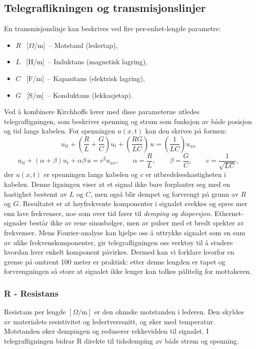 \subsection{Telegraflikningen og transmisjonslinjer}
En transmisjonslinje kan beskrives ved fire per-enhet-lengde parametre:
\begin{itemize}
    \item $R$ \, [$\Omega$/m] \,-- Motstand (ledertap),
    \item $L$ \, [H/m] \,-- Induktans (magnetisk lagring),
    \item $C$ \, [F/m] \,-- Kapasitans (elektrisk lagring),
    \item $G$ \, [S/m] \,-- Konduktans (lekkasjetap).
\end{itemize}
Ved å kombinere Kirchhoffs lover med disse parameterne utledes telegrafligningen, som beskriver spenning og strøm som funksjon av både posisjon og tid langs kabelen. For spenningen $u(x,t)$ kan den skrives på formen:
\begin{equation}
    u_{tt} + \left(\frac{R}{L} + \frac{G}{C}\right)u_t + \left(\frac{RG}{LC}\right)\,u = \left(\frac{1}{LC}\right) u_{xx}
\end{equation}
\[
    u_{tt} + \left(\alpha + \beta\right)u_t + \alpha\beta\,u = c^2 u_{xx}, \qquad \alpha=\frac{R}{L}, \qquad \beta=\frac{G}{C}, \qquad c = \frac{1}{\sqrt{LC}} ,
\]
der $u(x,t)$ er spenningen langs kabelen og $c$ er utbredelseshastigheten i kabelen.  
Denne ligningen viser at et signal ikke bare forplanter seg med en hastighet bestemt av $L$ og $C$, men også blir dempet og forvrengt på grunn av $R$ og $G$. Resultatet er at høyfrekvente komponenter i signalet svekkes og spres mer enn lave frekvenser, noe som over tid fører til \emph{demping og dispersjon}.  
Ethernet-signaler består ikke av rene sinusbølger, men av pulser med et bredt spekter av frekvenser. Mens Fourier-analyse kan hjelpe oss  å uttrykke signalet som en sum av ulike frekvenskomponenter, gir telegrafligningen oss verktøy til å studere hvordan hver enkelt komponent påvirkes. Dermed kan vi forklare hvorfor en grense på omtrent 100 meter er praktisk: etter denne lengden er tapet og forvrengningen så store at signalet ikke lenger kan tolkes pålitelig for mottakeren.


\subsubsection{R - Resistans}
Resistans per lengde $[\Omega/\mathrm{m}]$ er den ohmske motstanden i lederen. Den skyldes av materialets resistivitet og ledertverrsnitt, og øker med temperatur. Motstanden øker dempingen og reduserer rekkevidden til signalet. I telegrafligningen bidrar R direkte til tidsdemping av både strøm og spenning.

